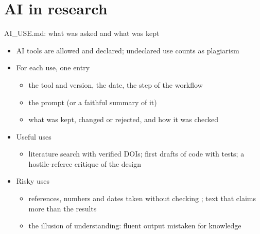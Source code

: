 \section{AI in research}

\begin{frame}{AI\_USE.md: what was asked and what was kept}
\itemsize{\small}
\begin{itemize}
    \item AI tools are allowed and declared; undeclared use counts as plagiarism
    \item For each use, one entry
    \begin{itemize}
        \item the tool and version, the date, the step of the workflow
        \item the prompt (or a faithful summary of it)
        \item what was kept, changed or rejected, and how it was checked
    \end{itemize}
    \item Useful uses
    \begin{itemize}
        \item literature search with verified DOIs; first drafts of code with tests; a hostile-referee critique of the design 
    \end{itemize}
    \item Risky uses
    \begin{itemize}
        \item references, numbers and dates taken without checking ; text that claims more than the results
        \item the illusion of understanding: fluent output mistaken for knowledge 
    \end{itemize}
\end{itemize}
\end{frame}

